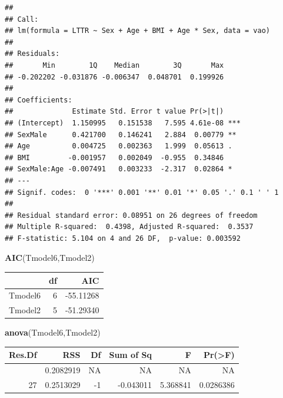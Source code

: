 \documentclass[
]{article}
\newenvironment{Shaded}{\begin{snugshade}}{\end{snugshade}}
\newcommand{\FunctionTok}[1]{\textcolor[rgb]{0.13,0.29,0.53}{\textbf{#1}}}
\newcommand{\NormalTok}[1]{#1}
\begin{document}
\begin{verbatim}
## 
## Call:
## lm(formula = LTTR ~ Sex + Age + BMI + Age * Sex, data = vao)
## 
## Residuals:
##       Min        1Q    Median        3Q       Max 
## -0.202202 -0.031876 -0.006347  0.048701  0.199926 
## 
## Coefficients:
##              Estimate Std. Error t value Pr(>|t|)    
## (Intercept)  1.150995   0.151538   7.595 4.61e-08 ***
## SexMale      0.421700   0.146241   2.884  0.00779 ** 
## Age          0.004725   0.002363   1.999  0.05613 .  
## BMI         -0.001957   0.002049  -0.955  0.34846    
## SexMale:Age -0.007491   0.003233  -2.317  0.02864 *  
## ---
## Signif. codes:  0 '***' 0.001 '**' 0.01 '*' 0.05 '.' 0.1 ' ' 1
## 
## Residual standard error: 0.08951 on 26 degrees of freedom
## Multiple R-squared:  0.4398, Adjusted R-squared:  0.3537 
## F-statistic: 5.104 on 4 and 26 DF,  p-value: 0.003592
\end{verbatim}

\begin{Shaded}
\begin{Highlighting}[]
\FunctionTok{AIC}\NormalTok{(Tmodel6,Tmodel2)}
\end{Highlighting}
\end{Shaded}

\begin{longtable}[]{@{}lrr@{}}
\toprule\noalign{}
& df & AIC \\
\midrule\noalign{}
\endhead
\bottomrule\noalign{}
\endlastfoot
Tmodel6 & 6 & -55.11268 \\
Tmodel2 & 5 & -51.29340 \\
\end{longtable}

\begin{Shaded}
\begin{Highlighting}[]
\FunctionTok{anova}\NormalTok{(Tmodel6,Tmodel2)}
\end{Highlighting}
\end{Shaded}

\begin{longtable}[]{@{}rrrrrr@{}}
\toprule\noalign{}
Res.Df & RSS & Df & Sum of Sq & F & Pr(\textgreater F) \\
\midrule\noalign{}
\endhead
\bottomrule\noalign{}
\endlastfoot
26 & 0.2082919 & NA & NA & NA & NA \\
27 & 0.2513029 & -1 & -0.043011 & 5.368841 & 0.0286386 \\
\end{longtable}
\end{document}
